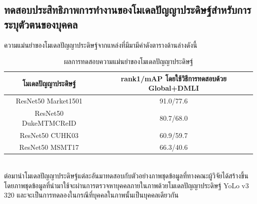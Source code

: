 \subsection{ทดสอบประสิทธิภาพการทำงานของโมเดลปัญญาประดิษฐ์สำหรับการระบุตัวตนของบุคคล}
\label{sec:reid_ex}
ความแม่นยำของโมเดลปัญญาประดิษฐ์จากแหล่งที่มีมามีค่าดังตารางด้านล่างดังนี้
\begin{table}[!ht]
    \centering
    \begin{tabular}{|c|c|}
            \hline
            {โมเดลปัญญาประดิษฐ์}&{rank1/mAP โดยใช้วิธีการทดสอบด้วย Global+DMLI}				\\
            \hline
            ResNet50 Market1501	 			& 91.0/77.6								\\
            ResNet50 DukeMTMCReID			& 80.7/68.0								\\
            ResNet50 CUHK03				& 60.9/59.7								\\
            ResNet50 MSMT17				& 66.3/40.6								\\
        \hline
    \end{tabular}
    \caption{ผลการทดสอบความแม่นยำของโมเดลปัญญาประดิษฐ์}
    \label{tab: Accuracy of model ReID}
\end{table}
\\
ต่อมานำโมเดลปัญญาประดิษฐ์แต่ละอันมาทดสอบกับตัวอย่างภาพชุดข้อมูลที่ทางคณะผู้วิจัยได้สร้างขึ้น โดยภาพชุดข้อมูลที่นำมาใช้จะผ่านการตรวจหาบุคคลภายในภาพด้วยโมเดลปัญญาประดิษฐ์ YoLo v3 320 และจะเป็นการทดลองในกรณีที่บุคคลในภาพนั้นเป็นบุคคลเดียวกัน
